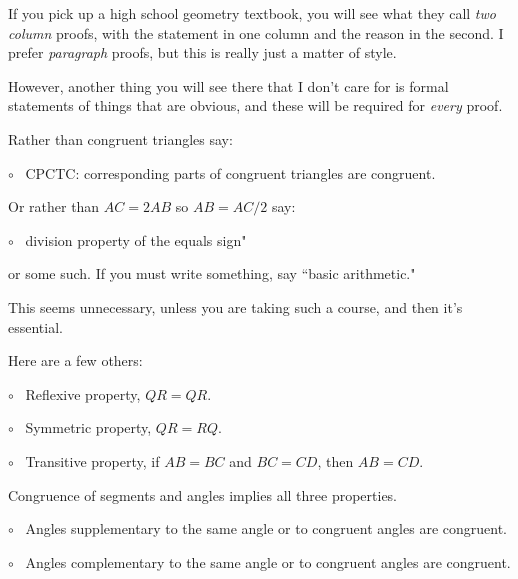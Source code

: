 \documentclass[11pt, oneside]{article}
\begin{document}
If you pick up a high school geometry textbook, you will see what they call \emph{two column} proofs, with the statement in one column and the reason in the second.  I prefer \emph{paragraph} proofs, but this is really just a matter of style.  

However, another thing you will see there that I don't care for is formal statements of things that are obvious, and these will be required for \emph{every} proof.

Rather than congruent triangles say:

$\circ$ \ CPCTC: corresponding parts of congruent triangles are congruent.

Or rather than $AC = 2 AB$ so $AB = AC/2$ say:

$\circ$ \ division property of the equals sign"

or some such.  If you must write something, say ``basic arithmetic."

This seems unnecessary, unless you are taking such a course, and then it's essential.

Here are a few others:

$\circ$ \ Reflexive property, $QR = QR$.

$\circ$ \ Symmetric property, $QR = RQ$.

$\circ$ \ Transitive property, if $AB = BC$ and $BC = CD$, then $AB = CD$.

Congruence of segments and angles implies all three properties.

$\circ$ \ Angles supplementary to the same angle or to congruent angles are congruent.

$\circ$ \ Angles complementary to the same angle or to congruent angles are congruent.
\end{document}
